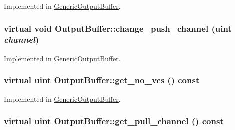Implemented in \hyperlink{classGenericOutputBuffer_c4f3cf09d07b340af349820bcaed731e}{GenericOutputBuffer}.\hypertarget{classOutputBuffer_45a685173b5c5cbe6270c9e0ce6d023a}{
\subsubsection[{change\_\-push\_\-channel}]{\setlength{\rightskip}{0pt plus 5cm}virtual void OutputBuffer::change\_\-push\_\-channel ({\bf uint} {\em channel})}}
\label{classOutputBuffer_45a685173b5c5cbe6270c9e0ce6d023a}




Implemented in \hyperlink{classGenericOutputBuffer_d7576df13afbc101eb997e35ad417739}{GenericOutputBuffer}.\hypertarget{classOutputBuffer_21ad5222afd999f390df4a495eb48b0a}{
\subsubsection[{get\_\-no\_\-vcs}]{\setlength{\rightskip}{0pt plus 5cm}virtual {\bf uint} OutputBuffer::get\_\-no\_\-vcs () const}}
\label{classOutputBuffer_21ad5222afd999f390df4a495eb48b0a}




Implemented in \hyperlink{classGenericOutputBuffer_6f5495e1ddd1b524d105d86b083e85cc}{GenericOutputBuffer}.\hypertarget{classOutputBuffer_c4460c1a1ac34667c12cc77c57a393b9}{
\subsubsection[{get\_\-pull\_\-channel}]{\setlength{\rightskip}{0pt plus 5cm}virtual {\bf uint} OutputBuffer::get\_\-pull\_\-channel () const}}
\label{classOutputBuffer_c4460c1a1ac34667c12cc77c57a393b9}




